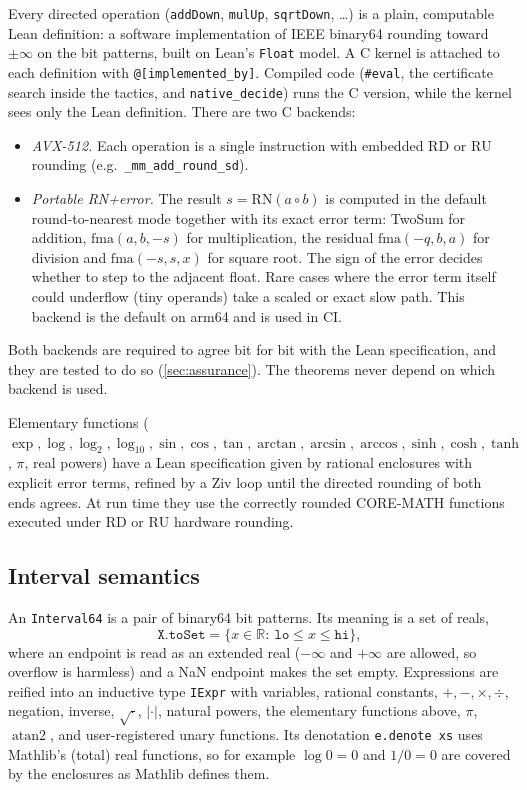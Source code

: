 \documentclass[11pt]{article}
\theoremstyle{definition}
\theoremstyle{remark}
\newcommand{\R}{\mathbb{R}}
\newcommand{\RD}{\mathrm{RD}}
\newcommand{\RU}{\mathrm{RU}}
\newcommand{\lean}[1]{\texttt{#1}}
\begin{document}
Every directed operation (\lean{addDown}, \lean{mulUp}, \lean{sqrtDown},
\dots) is a plain, computable Lean definition: a software implementation of
IEEE binary64 rounding toward $\pm\infty$ on the bit patterns, built on
Lean's \lean{Float} model. A C kernel is attached to each definition with
\lean{@[implemented\_by]}. Compiled code (\lean{\#eval}, the certificate
search inside the tactics, and \lean{native\_decide}) runs the C version,
while the kernel sees only the Lean definition. There are two C backends:
\begin{itemize}[nosep]
\item \emph{AVX-512.} Each operation is a single instruction with embedded
  $\RD$ or $\RU$ rounding (e.g.\ \lean{\_mm\_add\_round\_sd}).
\item \emph{Portable RN+error.} The result $s=\mathrm{RN}(a\circ b)$ is
  computed in the default round-to-nearest mode together with its exact
  error term: TwoSum for addition, $\mathrm{fma}(a,b,-s)$ for
  multiplication, the residual $\mathrm{fma}(-q,b,a)$ for division and
  $\mathrm{fma}(-s,s,x)$ for square root. The sign of the error decides
  whether to step to the adjacent float. Rare cases where the error term
  itself could underflow (tiny operands) take a scaled or exact slow path.
  This backend is the default on arm64 and is used in CI.
\end{itemize}
Both backends are required to agree bit for bit with the Lean
specification, and they are tested to do so (\cref{sec:assurance}). The
theorems never depend on which backend is used.

Elementary functions ($\exp,\log,\log_2,\log_{10},\sin,\cos,\tan,\arctan,
\arcsin,\arccos,\sinh,\cosh,\tanh$, $\pi$, real powers) have a Lean
specification given by rational enclosures with explicit error terms,
refined by a Ziv loop until the directed rounding of both ends agrees. At
run time they use the correctly rounded CORE-MATH functions~\cite{coremath}
executed under $\RD$ or $\RU$ hardware rounding.

\subsection{Interval semantics}

An \lean{Interval64} is a pair of binary64 bit patterns. Its meaning is a set
of reals,
\[
  \lean{X.toSet}=\{x\in\R:\ \lean{lo}\le x\le\lean{hi}\},
\]
where an endpoint is read as an extended real ($-\infty$ and $+\infty$
are allowed, so overflow is harmless) and a NaN endpoint makes the set
empty. Expressions are reified into an inductive type \lean{IExpr} with
variables, rational constants, $+,-,\times,\div$, negation, inverse,
$\sqrt{\cdot}$, $|\cdot|$, natural powers, the elementary functions above,
$\pi$, $\operatorname{atan2}$, and user-registered unary functions. Its
denotation \lean{e.denote xs} uses Mathlib's (total) real functions, so for
example $\log 0=0$ and $1/0=0$ are covered by the enclosures as Mathlib
defines them.
\end{document}

